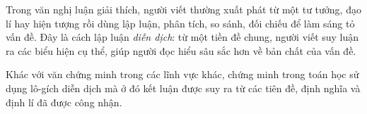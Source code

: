 Trong văn nghị luận giải thích, người viết thường xuất phát từ một tư tưởng, đạo lí hay hiện tượng rồi dùng lập luận, phân tích, so sánh, đối chiếu để làm sáng tỏ vấn đề. Đây là cách lập luận \emph{diễn dịch}: từ một tiền đề chung, người viết suy luận ra các biểu hiện cụ thể, giúp người đọc hiểu sâu sắc hơn về bản chất của vấn đề.

Khác với văn chứng minh trong các lĩnh vực khác, chứng minh trong toán học sử dụng lô-gích diễn dịch mà ở đó kết luận được suy ra từ các tiên đề, định nghĩa và định lí đã được công nhận.


